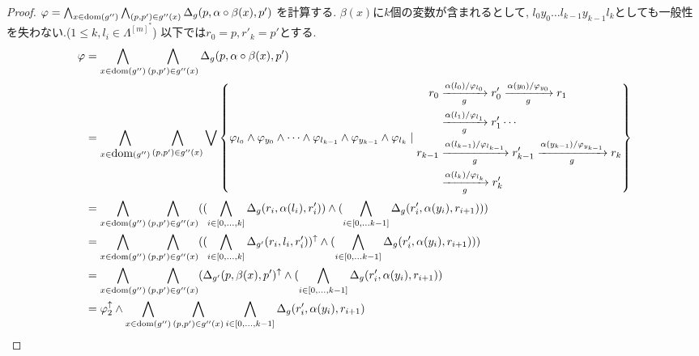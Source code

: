 \documentclass[uplatex,dvipdfmx,a4j]{jsreport}
\begin{document}
  \begin{proof}
    $\varphi = \bigwedge_{x \in \scriptsize \dom(g'')} \bigwedge_{(p, p') \in g''(x)}
      \Delta_g(p, \alpha \circ \beta (x), p')$
    を計算する.
    $\beta(x)$に$k$個の変数が含まれるとして,
    $l_0y_0 \ldots l_{k - 1}y_{k - 1}l_k$としても一般性を失わない.($1 \leq k, l_i \in \Lambda^{[m]^*}$)
    以下では$r_0 = p, r'_k = p'$とする.
    \begin{align*}
      \varphi &= \bigwedge_{x \in \scriptsize \dom(g'')} \bigwedge_{(p, p') \in g''(x)}
                  \Delta_g(p, \alpha \circ \beta (x), p')  \\
              &= \bigwedge_{x \in \dom(g'')} \bigwedge_{(p, p') \in g''(x)}
                  \bigvee \left\{
                  \varphi_{l_0} \land \varphi_{y_0} \land \cdots
                  \land \varphi_{l_{k - 1}} \land \varphi_{y_{k - 1}} \land \varphi_{l_k}
                  \mid
                    \begin{aligned}
                      r_0 &\transarrow{\alpha(l_0) / \varphi_{l_0}}{g} r'_0
                        \transarrow{\alpha(y_0) / \varphi_{y_0}}{g} r_1  \\
                        &\transarrow{\alpha(l_1) / \varphi_{l_1}}{g} r'_1 \cdots \\
                        r_{k - 1} &\transarrow{\alpha(l_{k - 1}) / \varphi_{l_{k - 1}}}{g} r'_{k - 1}
                        \transarrow{\alpha(y_{k - 1}) / \varphi_{y_{k - 1}}}{g} r_k \\
                        &\transarrow{\alpha(l_k) / \varphi_{l_k}}{g} r'_k
                    \end{aligned}
                  \right\} \\
              &= \bigwedge_{x \in \scriptsize \dom(g'')} \bigwedge_{(p, p') \in g''(x)}
                  (
                  (\bigwedge_{i \in [0, \ldots, k]} \Delta_g(r_i, \alpha(l_i), r'_i)) \land
                  (\bigwedge_{i \in [0, \ldots k - 1]} \Delta_g(r'_i, \alpha(y_i), r_{i + 1}))
                  )  \\
              &= \bigwedge_{x \in \scriptsize \dom(g'')} \bigwedge_{(p, p') \in g''(x)}
                  (
                  (\bigwedge_{i \in [0, \ldots, k]} \Delta_{g'}(r_i, l_i, r'_i))^\uparrow \land
                  (\bigwedge_{i \in [0, \ldots k - 1]} \Delta_g(r'_i, \alpha(y_i), r_{i + 1}))
                  )  \\
              &= \bigwedge_{x \in \scriptsize \dom(g'')} \bigwedge_{(p, p') \in g''(x)}
                  (
                    \Delta_{g'}(p, \beta(x), p')^\uparrow \land
                    (\bigwedge_{i \in [0, \ldots, k - 1]} \Delta_g(r'_i, \alpha(y_i), r_{i + 1})
                  ) \\
              &= \varphi_2^\uparrow \land
                  \bigwedge_{x \in \scriptsize \dom(g'')} \bigwedge_{(p, p') \in g''(x)}
                    \bigwedge_{i \in [0, \ldots, k - 1]} \Delta_g(r'_i, \alpha(y_i), r_{i + 1})
    \end{align*}


\end{proof}
\end{document}
